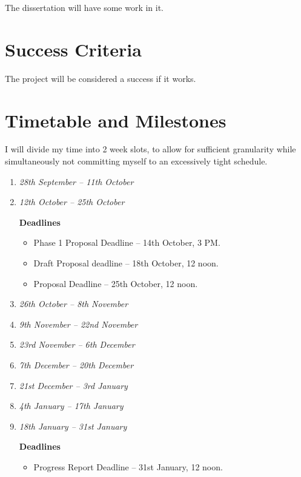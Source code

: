 \documentclass[a4paper,12pt]{article}
\begin{document}
The dissertation will have some work in it.

\section*{Success Criteria}

The project will be considered a success if it works.

\section*{Timetable and Milestones}

I will divide my time into 2 week slots, to allow for sufficient granularity while simultaneously not committing myself to an excessively tight schedule.

\begin{enumerate}[label=\textbf{Slot \arabic*} -,start = 0]
 \item 
 \emph{28th September -- 11th October}
 
 \item 
 \emph{12th October -- 25th October}
 
 \textbf{Deadlines}
 \begin{itemize}
  \item 
  Phase 1 Proposal Deadline -- 14th October, 3 PM.
  \item
  Draft Proposal deadline -- 18th October, 12 noon.
  \item
  Proposal Deadline -- 25th October, 12 noon.
 \end{itemize}
 
 \item 
 \emph{26th October -- 8th November}
 
 \item 
 \emph{9th November -- 22nd November}
 
 \item 
 \emph{23rd November -- 6th December}
 
 \item 
 \emph{7th December -- 20th December}
 
 \item 
 \emph{21st December -- 3rd January}
 
 \item 
 \emph{4th January -- 17th January}
 
 \item 
 \emph{18th January -- 31st January}
 
 
 \textbf{Deadlines}
 \begin{itemize}
  \item 
  Progress Report Deadline -- 31st January, 12 noon.
 \end{itemize}
 

\end{enumerate}
\end{document}
